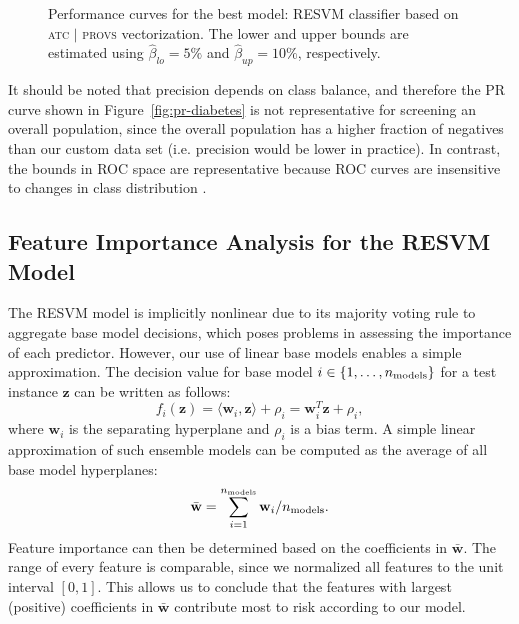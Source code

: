 \begin{figure}%
\centering
{}\hfill
{}
\caption{Performance curves for the best model: RESVM classifier based on \textsc{atc $|$ provs} vectorization. The lower and upper bounds are estimated using $\hat{\beta}_{lo}=5\%$ and $\hat{\beta}_{up}=10\%$, respectively. }
\label{fig:diabetes-performance-curves}
\end{figure}

It should be noted that precision depends on class balance, and therefore the PR curve shown in Figure~\ref{fig:pr-diabetes} is not representative for screening an overall population, since the overall population has a higher fraction of negatives than our custom data set (i.e. precision would be lower in practice). In contrast, the bounds in ROC space are representative because ROC curves are insensitive to changes in class distribution \citep{Fawcett:2006:IRA:1159473.1159475}.


\subsection{Feature Importance Analysis for the RESVM Model} \label{features}
The RESVM model is implicitly nonlinear due to its majority voting rule to aggregate base model decisions, which poses problems in assessing the importance of each predictor. However, our use of linear base models enables a simple approximation. The decision value for base model $i \in \{1,\ldots,n_{\rm models}\}$ for a test instance $\mathbf{z}$ can be written as follows:
\begin{equation*}
f_i(\mathbf{z}) = \langle \mathbf{w}_i, \mathbf{z}\rangle + \rho_i = \mathbf{w}_i^T\mathbf{z} + \rho_i,
\end{equation*}
where $\mathbf{w}_i$ is the separating hyperplane and $\rho_i$ is a bias term. A simple linear approximation of such ensemble models can be computed as the average of all base model hyperplanes:
\begin{equation*}
\bar{\mathbf{w}} = \sum_{i=1}^{n_{\rm models}} \mathbf{w}_i / n_{\rm models}.
\end{equation*}
Feature importance can then be determined based on the coefficients in $\bar{\mathbf{w}}$. The range of every feature is comparable, since we normalized all features to the unit interval $[0,1]$. This allows us to conclude that the features with largest (positive) coefficients in $\bar{\mathbf{w}}$ contribute most to risk according to our model. 

